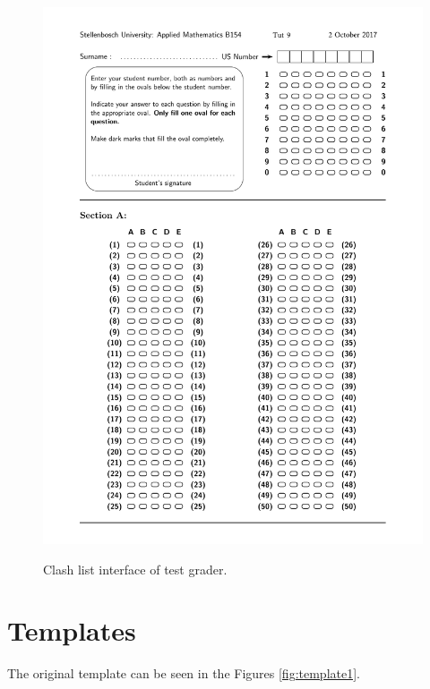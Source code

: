 \begin{figure}
  \centering
  \includegraphics[width=14cm]{clashInterface}\\
  \caption{Clash list interface of test grader.}
  \label{fig:clashInterface}
\end{figure}

\section{Templates}

The original template can be seen in the Figures \ref{fig:template1}. 

